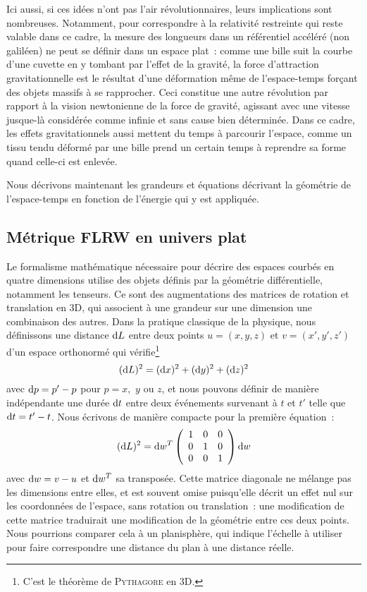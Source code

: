\documentclass[../main/main.tex]{subfiles}
\begin{document}
Ici aussi, si ces idées n'ont pas l'air révolutionnaires, leurs implications
sont nombreuses. Notamment, pour correspondre à la relativité restreinte qui
reste valable dans ce cadre, la mesure des longueurs dans un référentiel
accéléré (non galiléen) ne peut se définir dans un espace plat~: comme une bille
suit la courbe d'une cuvette en y tombant par l'effet de la gravité, la force
d'attraction gravitationnelle est le résultat d'une déformation même de
l'espace-temps forçant des objets massifs à se rapprocher. Ceci constitue une
autre révolution par rapport à la vision newtonienne de la force de gravité,
agissant avec une vitesse jusque-là considérée comme infinie et sans cause bien
déterminée. Dans ce cadre, les effets gravitationnels aussi mettent du temps à
parcourir l'espace, comme un tissu tendu déformé par une bille prend un certain
temps à reprendre sa forme quand celle-ci est enlevée.

Nous décrivons maintenant les grandeurs et équations décrivant la géométrie de
l'espace-temps en fonction de l'énergie qui y est appliquée.

\subsection{Métrique FLRW en univers plat}\label{ssec:cons}

Le formalisme mathématique nécessaire pour décrire des espaces courbés en
quatre dimensions utilise des objets définis par la géométrie différentielle,
notamment les tenseurs. Ce sont des augmentations des matrices de rotation et
translation en 3D, qui associent à une grandeur sur une dimension une
combinaison des autres. Dans la pratique classique de la physique, nous
définissons une distance $\mathrm{d} L$ entre deux points $u=(x,y,z)$ et $v=(x',y',z')$
d'un espace orthonormé qui vérifie\footnote{C'est le théorème de
\textsc{Pythagore} en 3D.}
\begin{equation}
    (\mathrm{d} L)^2 = (\mathrm{d} x)^2 + (\mathrm{d} y)^2 + (\mathrm{d} z)^2
\end{equation}
avec $\mathrm{d} p = p'-p$ pour $p = x,$ $y$ ou $z$, et nous pouvons définir de manière
indépendante une durée $\mathrm{d} t$ entre deux événements survenant à $t$ et $t'$
telle que $\mathrm{d} t = t'-t$. Nous écrivons de manière compacte pour la première
équation~:
\begin{equation}
    (\mathrm{d} L)^2 = \mathrm{d} w^T\left(\begin{array}{c c c}
            1 & 0 & 0\\
            0 & 1 & 0\\
            0 & 0 & 1\\
    \end{array}\right)\mathrm{d} w
\end{equation}
avec $\mathrm{d} w = v-u$ et $\mathrm{d} w^T$ sa transposée. Cette matrice diagonale ne mélange
pas les dimensions entre elles, et est souvent omise puisqu'elle décrit un effet
nul sur les coordonnées de l'espace, sans rotation ou translation~: une
modification de cette matrice traduirait une modification de la géométrie entre
ces deux points. Nous pourrions comparer cela à un planisphère, qui indique
l'échelle à utiliser pour faire correspondre une distance du plan à une distance
réelle.
\end{document}
